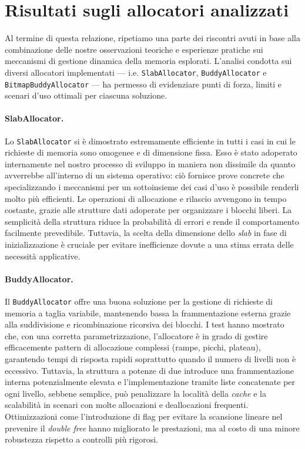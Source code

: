 \section{Risultati sugli allocatori analizzati}

Al termine di questa relazione, ripetiamo una parte dei riscontri avuti in base alla combinazione delle nostre osservazioni teoriche e esperienze pratiche sui meccanismi di gestione dinamica della memoria esplorati. L’analisi condotta sui diversi allocatori implementati — i.e. \texttt{SlabAllocator}, \texttt{BuddyAllocator} e \texttt{BitmapBuddyAllocator} — ha permesso di evidenziare punti di forza, limiti e scenari d’uso ottimali per ciascuna soluzione. 

\paragraph{SlabAllocator.}
Lo \texttt{SlabAllocator} si è dimostrato estremamente efficiente in tutti i casi in cui le richieste di memoria sono omogenee e di dimensione fissa. Esso è stato adoperato internamente nel nostro processo di sviluppo in maniera non dissimile da quanto avverrebbe all'interno di un sistema operativo: ciò fornisce prove concrete che specializzando i meccanismi per un sottoinsieme dei casi d'uso è possibile renderli molto più efficienti. Le operazioni di allocazione e rilascio avvengono in tempo costante, grazie alle strutture dati adoperate per organizzare i blocchi liberi. La semplicità della struttura riduce la probabilità di errori e rende il comportamento facilmente prevedibile. Tuttavia, la scelta della dimensione dello \textit{slab} in fase di inizializzazione è cruciale per evitare inefficienze dovute a una stima errata delle necessità applicative. 

\paragraph{BuddyAllocator.}
Il \texttt{BuddyAllocator} offre una buona soluzione per la gestione di richieste di memoria a taglia variabile, mantenendo bassa la frammentazione esterna grazie alla suddivisione e ricombinazione ricorsiva dei blocchi. I test hanno mostrato che, con una corretta parametrizzazione, l’allocatore è in grado di gestire efficacemente pattern di allocazione complessi (rampe, picchi, plateau), garantendo tempi di risposta rapidi soprattutto quando il numero di livelli non è eccessivo. Tuttavia, la struttura a potenze di due introduce una frammentazione interna potenzialmente elevata e l’implementazione tramite liste concatenate per ogni livello, sebbene semplice, può penalizzare la località della \textit{cache} e la scalabilità in scenari con molte allocazioni e deallocazioni frequenti. Ottimizzazioni come l’introduzione di flag per evitare la scansione lineare nel prevenire il \textit{double free} hanno migliorato le prestazioni, ma al costo di una minore robustezza rispetto a controlli più rigorosi.


